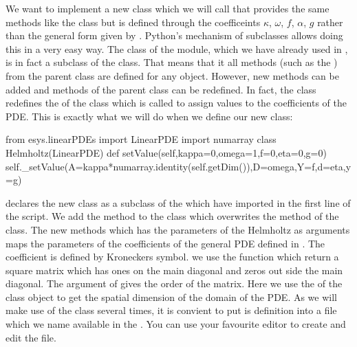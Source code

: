 We want to implement a 
new class which we will call  that provides the same methods like the \LinearPDE class but
is defined through the coefficeints $\kappa$, $\omega$, $f$, $\alpha$, 
$g$ rather than the general form given by . 
Python's mechanism of subclasses allows doing this in a very easy way.
The \Poisson class of the \linearPDEsPack module,
which we have already used in , is in fact a subclass of the 
\LinearPDE class. That means that it all methods (such as the )
from the parent class \LinearPDE are defined for any \Poisson object. However, new
methods can be added and methods of the parent class can be redefined. In fact,
the \Poisson class redefines the  of the \LinearPDE class which is called to assign 
values to the coefficients of the PDE. This is exactly what we will do when we define 
our new  class:
\begin{python}
from esys.linearPDEs import LinearPDE
import numarray
class Helmholtz(LinearPDE)
   def setValue(self,kappa=0,omega=1,f=0,eta=0,g=0)
        self._setValue(A=kappa*numarray.identity(self.getDim()),D=omega,Y=f,d=eta,y=g)
\end{python}
 declares the new  class as a subclass 
of the \LinearPDE which have imported in the first line of the script. 
We add the method  to the class which overwrites the 
 method of the \LinearPDE class. The new methods which has the 
parameters of the Helmholtz  as arguments 
maps the parameters of the coefficients of the general PDE defined 
in . The coefficient  is defined by Kroneckers symbol. we use the
\numarray function  which return a square matrix which has ones on the
main diagonal and zeros out side the main diagonal. The argument of  gives the order of the matrix.
Here we use
the  of the \LinearPDE class object  to get the spatial dimension of the domain of the
PDE. As we will make use of the  class several times, it is convient to 
put is definition into a file which we name  available in the \ExampleDirectory.
You can use your favourite editor to create and edit the file.   

